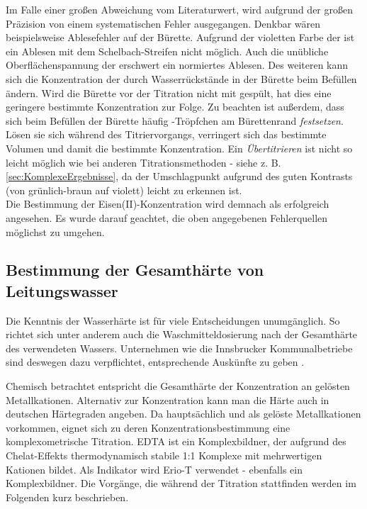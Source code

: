 \documentclass{article}
\begin{document}
        Im Falle einer großen Abweichung vom Literaturwert, wird aufgrund der großen Präzision von einem systematischen Fehler ausgegangen. Denkbar wären beispielsweise Ablesefehler auf der Bürette. Aufgrund der violetten Farbe der  ist ein Ablesen mit dem Schelbach-Streifen nicht möglich. Auch die unübliche Oberflächenspannung der  erschwert ein normiertes Ablesen. Des weiteren kann sich die Konzentration der  durch Wasserrückstände in der Bürette beim Befüllen ändern. Wird die Bürette vor der Titration nicht mit  gespült, hat dies eine geringere bestimmte Konzentration zur Folge. Zu beachten ist außerdem, dass sich beim Befüllen der Bürette häufig -Tröpfchen am Bürettenrand \textit{festsetzen}. Lösen sie sich während des Titriervorgangs, verringert sich das bestimmte Volumen und damit die bestimmte Konzentration. Ein \textit{Übertitrieren} ist nicht so leicht möglich wie bei anderen Titrationsmethoden - siehe z. B. \ref{sec:KomplexeErgebnisse}, da der Umschlagpunkt aufgrund des guten Kontrasts (von grünlich-braun auf violett) leicht zu erkennen ist. \\
        
        Die Bestimmung der Eisen(II)-Konzentration wird demnach als erfolgreich angesehen. Es wurde darauf geachtet, die oben angegebenen Fehlerquellen möglichst zu umgehen.
        
    \pagebreak
    
    \subsection{Bestimmung der Gesamthärte von Leitungswasser} \label{sec:harte}
      
      Die Kenntnis der Wasserhärte ist für viele Entscheidungen unumgänglich. So richtet sich unter anderem auch die Waschmitteldosierung nach der Gesamthärte des verwendeten Wassers. Unternehmen wie die Innsbrucker Kommunalbetriebe sind deswegen dazu verpflichtet, entsprechende Auskünfte zu geben \cite{ikb}.
      
      Chemisch betrachtet entspricht die Gesamthärte der Konzentration an gelösten Metallkationen. Alternativ zur Konzentration kann man die Härte auch in deutschen Härtegraden angeben. Da hauptsächlich  und  als gelöste Metallkationen vorkommen, eignet sich zu deren Konzentrationsbestimmung eine komplexometrische Titration. EDTA ist ein Komplexbildner, der aufgrund des Chelat-Effekts thermodynamisch stabile 1:1 Komplexe mit mehrwertigen Kationen bildet. Als Indikator wird Erio-T verwendet - ebenfalls ein Komplexbildner. Die Vorgänge, die während der Titration stattfinden werden im Folgenden kurz beschrieben. \\
      
\end{document}
